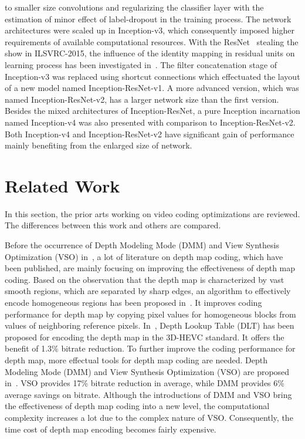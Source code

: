 to smaller size convolutions and regularizing the classifier layer with
the estimation of minor effect of label-dropout in the training process.
The network architectures were scaled up in Inception-v3, which consequently
imposed higher requirements of available computational resources.
With the ResNet~\parencite{RN67} stealing the show in ILSVRC-2015,
the influence of the
identity mapping in residual units on learning process
has been investigated in~\parencite{RN63}.
The filter concatenation stage of Inception-v3 was replaced using shortcut
connections which effectuated the layout of a new model 
named Inception-ResNet-v1.
A more advanced version, which was named Inception-ResNet-v2, has a larger
network size than the first version.
Besides the mixed architectures of Inception-ResNet, a pure Inception
incarnation named Inception-v4 was also presented with comparison to
Inception-ResNet-v2.
Both Inception-v4 and Inception-ResNet-v2 have significant gain of performance
mainly benefiting from the enlarged size of network.

\section{Related Work}\label{sec:related-work}
In this section, the prior arts working on video
coding optimizations are reviewed.
The differences between this work and others
are compared.

Before the occurrence of Depth Modeling Mode (DMM) and
View Synthesis Optimization (VSO) in~\parencite{RN208}, a lot of literature
on depth map coding, which have been published, are mainly
focusing on improving the effectiveness of depth map coding.
Based on the observation that the depth map is characterized by vast
smooth regions, which are separated by sharp edges, 
an algorithm to effectively
encode homogeneous regions has been proposed in~\parencite{RN120}.
It improves coding performance for depth map by copying pixel values for
homogeneous blocks from values of neighboring reference pixels.
In~\parencite{RN123}, Depth Lookup Table (DLT) has been proposed for
encoding the depth map in the 3D-HEVC standard.
It offers the benefit of 1.3\% bitrate reduction.
To further improve the coding performance for depth map, more
effectual tools for depth map coding are needed.
Depth Modeling Mode (DMM) and View Synthesis Optimization (VSO) are proposed
in~\parencite{RN208}.
VSO provides 17\% bitrate reduction in average, while DMM provides 6\% 
average savings on bitrate.
Although the introductions of DMM and VSO bring the effectiveness of
depth map coding into a new level, the computational complexity increases
a lot due to the complex nature of VSO\@.
Consequently, the time cost of depth map encoding becomes fairly expensive.

